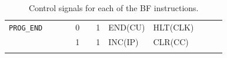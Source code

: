 \begin{footnotesize}
\begin{longtable}[c] {c|ccccc|c|lllll}
    \rowcolor{Gray}  \texttt{PROG\_END}  &   &   &   & 0 &   & 1  &  END(CU)    & HLT(CLK)  &           &        &                \\ 
    \rowcolor{White}                     &   &   &   & 1 &   & 1  &  INC(IP)    & CLR(CC)    &           &        &                \\ \hline

    
       
    

    \caption{Control signals for each of the BF instructions.}
    \label{tab:microcode}
  \end{longtable}
\end{footnotesize}
